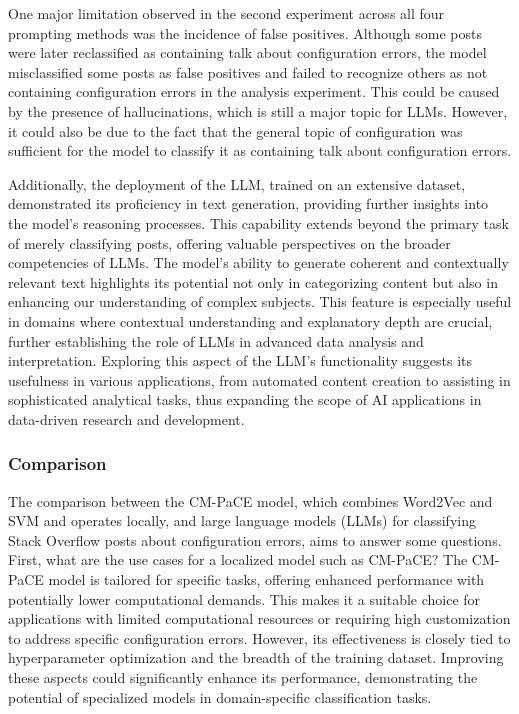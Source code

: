 \documentclass[english,bachelor]{swsLeipzig}
\begin{document}
One major limitation observed in the second experiment across all four prompting methods was the 
incidence of false positives. Although some posts were later reclassified as containing talk about configuration errors, the model misclassified some posts as false positives and failed to recognize others as not containing configuration errors in the analysis experiment. This could be caused by the presence of hallucinations, which is still a major topic for LLMs. However, it could also be due to the fact that the general topic of configuration was sufficient for the model to classify it as containing talk about configuration errors.

Additionally, the deployment of the LLM, trained on an extensive dataset, demonstrated its proficiency 
in text generation, providing further insights into the model's reasoning processes. This capability extends beyond the primary task of merely classifying posts, offering valuable perspectives on the broader competencies of LLMs. The model's ability to generate coherent and contextually relevant text highlights its potential not only in categorizing content but also in enhancing our understanding of complex subjects. This feature is especially useful in domains where contextual understanding and explanatory depth are crucial, further establishing the role of LLMs in advanced data analysis and interpretation. Exploring this aspect of the LLM's functionality suggests its usefulness in various applications, from automated content creation to assisting in sophisticated analytical tasks, thus expanding the scope of AI applications in data-driven research and development.

\subsubsection{Comparison}

The comparison between the CM-PaCE model, which combines Word2Vec and SVM and operates locally, and 
large language models (LLMs) for classifying Stack Overflow posts about configuration errors, aims to answer some questions. First, what are the use cases for a localized model such as CM-PaCE? The CM-PaCE model is tailored for specific tasks, offering enhanced performance with potentially lower computational demands. This makes it a suitable choice for applications with limited computational resources or requiring high customization to address specific configuration errors. However, its effectiveness is closely tied to hyperparameter optimization and the breadth of the training dataset. Improving these aspects could significantly enhance its performance, demonstrating the potential of specialized models in domain-specific classification tasks.
\end{document}
